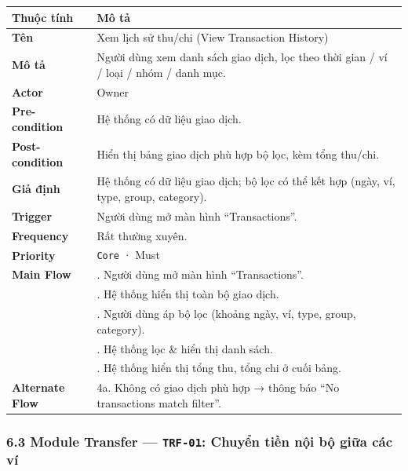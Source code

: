 \documentclass[11pt,a4paper]{article}
\newcounter{none}
\newcommand{\faintline}{%
  \noalign{\global\arrayrulecolor{faintgray}}%
  \hline
  \noalign{\global\arrayrulecolor{black}}%
} %
\begin{document}
{\def\LTcaptype{none}
\begin{longtable}[]{@{}
  >{\raggedright\arraybackslash}p{}
  >{\raggedright\arraybackslash}p{}@{}}
\toprule\noalign{}
\begin{minipage}[b]{\linewidth}\raggedright
Thuộc tính
\end{minipage} & \begin{minipage}[b]{\linewidth}\raggedright
Mô tả
\end{minipage} \\
\midrule\noalign{}
\endhead
\bottomrule\noalign{}
\endlastfoot
\textbf{Tên} & Xem lịch sử thu/chi (View Transaction History) \\ \faintline
\textbf{Mô tả} & Người dùng xem danh sách giao dịch, lọc theo thời gian / ví / loại / nhóm / danh mục. \\ \faintline
\textbf{Actor} & Owner \\ \faintline
\textbf{Pre-condition} & Hệ thống có dữ liệu giao dịch. \\ \faintline
\textbf{Post-condition} & Hiển thị bảng giao dịch phù hợp bộ lọc, kèm tổng thu/chi. \\ \faintline
\textbf{Giả định} & Hệ thống có dữ liệu giao dịch; bộ lọc có thể kết hợp (ngày, ví, type, group, category). \\ \faintline
\textbf{Trigger} & Người dùng mở màn hình ``Transactions''. \\ \faintline
\textbf{Frequency} & Rất thường xuyên. \\ \faintline
\textbf{Priority} & \texttt{Core} · Must \\ \faintline
\textbf{Main Flow} & 1. Người dùng mở màn hình ``Transactions''.\\
&2. Hệ thống hiển thị toàn bộ giao dịch.\\
&3. Người dùng áp bộ lọc (khoảng ngày, ví, type, group, category).\\
&4. Hệ thống lọc \& hiển thị danh sách.\\
&5. Hệ thống hiển thị tổng thu, tổng chi ở cuối bảng. \\ \faintline
\textbf{Alternate Flow} & 4a. Không có giao dịch phù hợp → thông báo ``No transactions match filter''. \\
\end{longtable}
}

\subsubsection{\texorpdfstring{6.3 Module Transfer --- \texttt{TRF-01}: Chuyển tiền nội bộ giữa các ví}{6.3 Module Transfer --- TRF-01: Chuyển tiền nội bộ giữa các ví}}\label{module-transfer-trf-01-chuyux1ec3n-tiux1ec1n-nux1ed9i-bux1ed9-giux1eefa-cuxe1c-vuxed}
\end{document}
